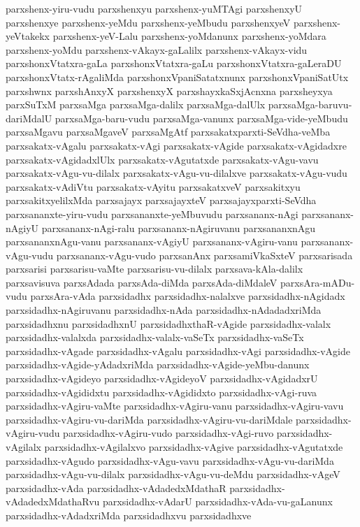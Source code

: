 {parxshenx-yiru-vudu
parxshenxyu
parxshenx-yuMTAgi
parxshenxyU
parxshenxye
parxshenx-yeMdu
parxshenx-yeMbudu
parxshenxyeV
parxshenx-yeVtakekx
parxshenx-yeV-Lalu
parxshenx-yoMdanunx
parxshenx-yoMdara
parxshenx-yoMdu
parxshenx-vAkayx-gaLalilx
parxshenx-vAkayx-vidu
parxshonxVtatxra-gaLa
parxshonxVtatxra-gaLu
parxshonxVtatxra-gaLeraDU
parxshonxVtatx-rAgaliMda
parxshonxVpaniSatatxnunx
parxshonxVpaniSatUtx
parxshwnx
parxshAnxyX
parxshenxyX
parxshayxkaSxjAcnxna
parxsheyxya
parxSuTxM
parxsaMga
parxsaMga-dalilx
parxsaMga-dalUlx
parxsaMga-baruvu-dariMdalU
parxsaMga-baru-vudu
parxsaMga-vanunx
parxsaMga-vide-yeMbudu
parxsaMgavu
parxsaMgaveV
parxsaMgAtf
parxsakatxparxti-SeVdha-veMba
parxsakatx-vAgalu
parxsakatx-vAgi
parxsakatx-vAgide
parxsakatx-vAgidadxre
parxsakatx-vAgidadxlUlx
parxsakatx-vAgutatxde
parxsakatx-vAgu-vavu
parxsakatx-vAgu-vu-dilalx
parxsakatx-vAgu-vu-dilalxve
parxsakatx-vAgu-vudu
parxsakatx-vAdiVtu
parxsakatx-vAyitu
parxsakatxveV
parxsakitxyu
parxsakitxyelilxMda
parxsajayx
parxsajayxteV
parxsajayxparxti-SeVdha
parxsananxte-yiru-vudu
parxsananxte-yeMbuvudu
parxsananx-nAgi
parxsananx-nAgiyU
parxsananx-nAgi-ralu
parxsananx-nAgiruvanu
parxsananxnAgu
parxsananxnAgu-vanu
parxsananx-vAgiyU
parxsananx-vAgiru-vanu
parxsananx-vAgu-vudu
parxsananx-vAgu-vudo
parxsanAnx
parxsamiVkaSxteV
parxsarisada
parxsarisi
parxsarisu-vaMte
parxsarisu-vu-dilalx
parxsava-kAla-dalilx
parxsavisuva
parxsAdada
parxsAda-diMda
parxsAda-diMdaleV
parxsAra-mADu-vudu
parxsAra-vAda
parxsidadhx
parxsidadhx-nalalxve
parxsidadhx-nAgidadx
parxsidadhx-nAgiruvanu
parxsidadhx-nAda
parxsidadhx-nAdadadxriMda
parxsidadhxnu
parxsidadhxnU
parxsidadhxthaR-vAgide
parxsidadhx-valalx
parxsidadhx-valalxda
parxsidadhx-valalx-vaSeTx
parxsidadhx-vaSeTx
parxsidadhx-vAgade
parxsidadhx-vAgalu
parxsidadhx-vAgi
parxsidadhx-vAgide
parxsidadhx-vAgide-yAdadxriMda
parxsidadhx-vAgide-yeMbu-danunx
parxsidadhx-vAgideyo
parxsidadhx-vAgideyoV
parxsidadhx-vAgidadxrU
parxsidadhx-vAgididxtu
parxsidadhx-vAgididxto
parxsidadhx-vAgi-ruva
parxsidadhx-vAgiru-vaMte
parxsidadhx-vAgiru-vanu
parxsidadhx-vAgiru-vavu
parxsidadhx-vAgiru-vu-dariMda
parxsidadhx-vAgiru-vu-dariMdale
parxsidadhx-vAgiru-vudu
parxsidadhx-vAgiru-vudo
parxsidadhx-vAgi-ruvo
parxsidadhx-vAgilalx
parxsidadhx-vAgilalxvo
parxsidadhx-vAgive
parxsidadhx-vAgutatxde
parxsidadhx-vAgudo
parxsidadhx-vAgu-vavu
parxsidadhx-vAgu-vu-dariMda
parxsidadhx-vAgu-vu-dilalx
parxsidadhx-vAgu-vu-deMdu
parxsidadhx-vAgeV
parxsidadhx-vAda
parxsidadhx-vAdadedxMdathaR
parxsidadhx-vAdadedxMdathaRvu
parxsidadhx-vAdarU
parxsidadhx-vAda-vu-gaLanunx
parxsidadhx-vAdadxriMda
parxsidadhxvu
parxsidadhxve
}
